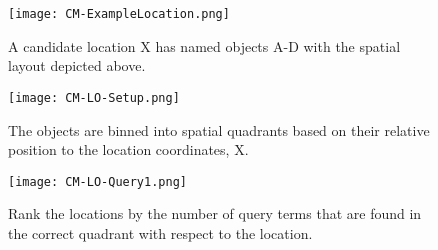 \begin{figure*}[t]
    \centering
    \begin{subfigure}[t]{.25\textwidth}
        \texttt{[image: CM-ExampleLocation.png]}
        \caption{\small A candidate location X has named objects A-D with the spatial layout depicted above.} 
        \label{fig:CM-LO-Example}
    \end{subfigure}
    \hfill
    \begin{subfigure}[t]{.25\textwidth}
        \texttt{[image: CM-LO-Setup.png]}
        \caption{\small The objects are binned into spatial quadrants based on their relative position to the location coordinates, X.} 
        \label{fig:CM-LO-Setup}
    \end{subfigure}
    \hfill
        \begin{subfigure}[t]{.25\textwidth}
        \texttt{[image: CM-LO-Query1.png]}
        \caption{\small Rank the locations by the number of query terms that are found in the correct quadrant with respect to the location.}
        \label{fig:CM-LO-Query}
    \hfill
    \end{subfigure}
    \caption{\textbf{Object-Location Search Method. A Location-centric data structure (Figure \ref{fig:CM-LO-Setup}) is generated based on the cardinal relations between the objects and the location (Figure \ref{fig:CM-LO-Example}). Then a pictorial query is matched against the structure (Figure \ref{fig:CM-LO-Query}).}}\label{figure:ConceptMap-LO} 
\end{figure*}





